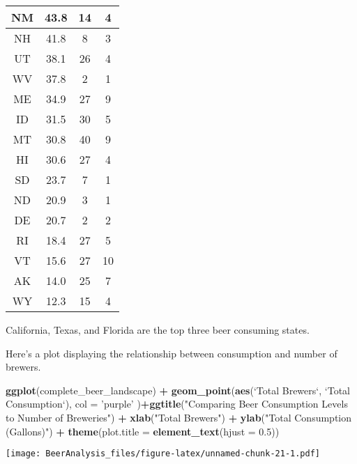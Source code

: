 \documentclass[]{article}
\newenvironment{Shaded}{\begin{snugshade}}{\end{snugshade}}
\newcommand{\DataTypeTok}[1]{\textcolor[rgb]{0.13,0.29,0.53}{#1}}
\newcommand{\FloatTok}[1]{\textcolor[rgb]{0.00,0.00,0.81}{#1}}
\newcommand{\KeywordTok}[1]{\textcolor[rgb]{0.13,0.29,0.53}{\textbf{#1}}}
\newcommand{\NormalTok}[1]{#1}
\newcommand{\OperatorTok}[1]{\textcolor[rgb]{0.81,0.36,0.00}{\textbf{#1}}}
\newcommand{\StringTok}[1]{\textcolor[rgb]{0.31,0.60,0.02}{#1}}
\begin{document}
\begin{table}[H]
\begin{tabular}{c|c|c|c}
\hline
NM & 43.8 & 14 & 4\\
\hline
NH & 41.8 & 8 & 3\\
\hline
UT & 38.1 & 26 & 4\\
\hline
WV & 37.8 & 2 & 1\\
\hline
ME & 34.9 & 27 & 9\\
\hline
ID & 31.5 & 30 & 5\\
\hline
MT & 30.8 & 40 & 9\\
\hline
HI & 30.6 & 27 & 4\\
\hline
SD & 23.7 & 7 & 1\\
\hline
ND & 20.9 & 3 & 1\\
\hline
DE & 20.7 & 2 & 2\\
\hline
RI & 18.4 & 27 & 5\\
\hline
VT & 15.6 & 27 & 10\\
\hline
AK & 14.0 & 25 & 7\\
\hline
WY & 12.3 & 15 & 4\\
\hline
\end{tabular}
\end{table}

California, Texas, and Florida are the top three beer consuming states.

Here's a plot displaying the relationship between consumption and number
of brewers.

\begin{Shaded}
\begin{Highlighting}[]
\KeywordTok{ggplot}\NormalTok{(complete_beer_landscape) }\OperatorTok{+}\StringTok{ }\KeywordTok{geom_point}\NormalTok{(}\KeywordTok{aes}\NormalTok{(}\StringTok{`}\DataTypeTok{Total Brewers}\StringTok{`}\NormalTok{, }\StringTok{`}\DataTypeTok{Total Consumption}\StringTok{`}\NormalTok{), }\DataTypeTok{col =} \StringTok{'purple'}\NormalTok{ )}\OperatorTok{+}\KeywordTok{ggtitle}\NormalTok{(}\StringTok{"Comparing Beer Consumption Levels to Number of Breweries"}\NormalTok{) }\OperatorTok{+}\StringTok{ }\KeywordTok{xlab}\NormalTok{(}\StringTok{"Total Brewers"}\NormalTok{) }\OperatorTok{+}\StringTok{ }\KeywordTok{ylab}\NormalTok{(}\StringTok{"Total Consumption (Gallons)"}\NormalTok{) }\OperatorTok{+}\StringTok{ }\KeywordTok{theme}\NormalTok{(}\DataTypeTok{plot.title =} \KeywordTok{element_text}\NormalTok{(}\DataTypeTok{hjust =} \FloatTok{0.5}\NormalTok{))}
\end{Highlighting}
\end{Shaded}

\texttt{[image: BeerAnalysis\_files/figure-latex/unnamed-chunk-21-1.pdf]}
\end{document}

